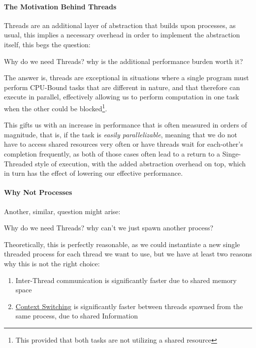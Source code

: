 \documentclass[openright, twoside]{report}
\theoremstyle{definition}
\theoremstyle{example}
\begin{document}
			\paragraph{The Motivation Behind Threads}
			Threads are an additional layer of abstraction that builds upon processes,
			as usual, this implies a necessary overhead in order to implement the abstraction
			itself, this begs the question:

			\begin{center}
				Why do we need Threads? why is the additional performance burden worth it?
			\end{center}

			The answer is, threads are exceptional in situations where a single program 
			must perform CPU-Bound tasks that are different in nature, and that therefore
			can execute in parallel, effectively allowing us to perform computation in one 
			task when the other could be blocked\footnote{This provided that both tasks are
			not utilizing a shared resource}.

			This gifts us with an increase in performance that is often measured in orders 
			of magnitude, that is, if the task is \emph{easily parallelizable}, meaning that 
			we do not have to access shared resources very often or have threads wait for
			each-other's completion frequently, as both of those cases often lead to a return
			to a Singe-Threaded style of execution, with the added abstraction overhead on top,
			which in turn has the effect of lowering our effective performance.

			\paragraph{Why Not Processes}
			Another, similar, question might arise:
			\begin{center}
				Why do we need Threads? why can't we just spawn another process?
			\end{center}

			Theoretically, this is perfectly reasonable, as we could instantiate
			a new single threaded process for each thread we want to use, but we
			have at least two reasons why this is not the right choice:
			\begin{enumerate}
				\item Inter-Thread communication is significantly faster due to
				shared memory space
				\item \hyperref[ssec:context]{Context Switching} is significantly faster between threads 
				spawned from the same process, due to shared Information
			\end{enumerate}
\end{document}
